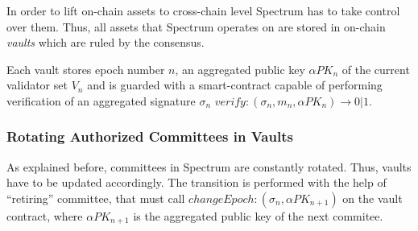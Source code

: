 In order to lift on-chain assets to cross-chain level Spectrum has to take control over them.
Thus, all assets that Spectrum operates on are stored in on-chain \emph{vaults} which are ruled by the consensus.

Each vault stores epoch number $n$, an aggregated public key $\alpha{PK_n}$ of the current validator set $V_n$ and
is guarded with a smart-contract capable of performing verification of
an aggregated signature $\sigma_n$ ${verify: (\sigma_n, m_n, \alpha{PK_n}) \rightarrow 0 | 1}$.

\subsubsection{Rotating Authorized Committees in Vaults}

As explained before, committees in Spectrum are constantly rotated.
Thus, vaults have to be updated accordingly.
The transition is performed with the help of \enquote{retiring} committee, that must call ${changeEpoch: (\sigma_n, \alpha{PK_{n+1}})}$ on the vault contract, where $\alpha{PK_{n+1}}$ is the aggregated public key of the next commitee.

